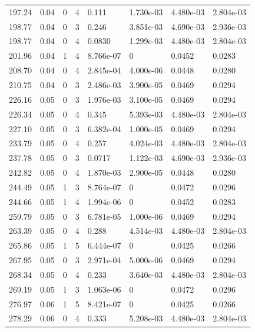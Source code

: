 \documentclass[preview]{standalone}
\begin{document}
{{{\begin{tabular}{L{1.2cm}C{1.2cm} C{0.3cm}C{0.5cm} C{1.4cm}C{1.4cm} C{1.4cm}C{1.4cm}}
  197.24  &  0.04  & 0     &  4 &  0.111  & 1.730e-03  & 4.480e-03 &  2.804e-03   \\ 
  198.77  &  0.04  & 0     &  3 &  0.246  & 3.851e-03  & 4.690e-03 &  2.936e-03   \\ 
  198.77  &  0.04  & 0     &  4 &  0.0830  & 1.299e-03  & 4.480e-03 &  2.804e-03   \\ 
  201.96  &  0.04  & 1     &  4 &  8.766e-07  & 0  & 0.0452 &  0.0283   \\ 
  208.70  &  0.04  & 0     &  4 &  2.845e-04  & 4.000e-06  & 0.0448 &  0.0280   \\ 
  210.75  &  0.04  & 0     &  3 &  2.486e-03  & 3.900e-05  & 0.0469 &  0.0294   \\ 
  226.16  &  0.05  & 0     &  3 &  1.976e-03  & 3.100e-05  & 0.0469 &  0.0294   \\ 
  226.34  &  0.05  & 0     &  4 &  0.345  & 5.393e-03  & 4.480e-03 &  2.804e-03   \\ 
  227.10  &  0.05  & 0     &  3 &  6.382e-04  & 1.000e-05  & 0.0469 &  0.0294   \\ 
  233.79  &  0.05  & 0     &  4 &  0.257  & 4.024e-03  & 4.480e-03 &  2.804e-03   \\ 
  237.78  &  0.05  & 0     &  3 &  0.0717  & 1.122e-03  & 4.690e-03 &  2.936e-03   \\ 
  242.82  &  0.05  & 0     &  4 &  1.870e-03  & 2.900e-05  & 0.0448 &  0.0280   \\ 
  244.49  &  0.05  & 1     &  3 &  8.764e-07  & 0  & 0.0472 &  0.0296   \\ 
  244.66  &  0.05  & 1     &  4 &  1.994e-06  & 0  & 0.0452 &  0.0283   \\ 
  259.79  &  0.05  & 0     &  3 &  6.781e-05  & 1.000e-06  & 0.0469 &  0.0294   \\ 
  263.39  &  0.05  & 0     &  4 &  0.288  & 4.514e-03  & 4.480e-03 &  2.804e-03   \\ 
  265.86  &  0.05  & 1     &  5 &  6.444e-07  & 0  & 0.0425 &  0.0266   \\ 
  267.95  &  0.05  & 0     &  3 &  2.971e-04  & 5.000e-06  & 0.0469 &  0.0294   \\ 
  268.34  &  0.05  & 0     &  4 &  0.233  & 3.640e-03  & 4.480e-03 &  2.804e-03   \\ 
  269.19  &  0.05  & 1     &  3 &  1.063e-06  & 0  & 0.0472 &  0.0296   \\ 
  276.97  &  0.06  & 1     &  5 &  8.421e-07  & 0  & 0.0425 &  0.0266   \\ 
  278.29  &  0.06  & 0     &  4 &  0.333  & 5.208e-03  & 4.480e-03 &  2.804e-03   \\ 

\end{tabular}}}}
\end{document}
